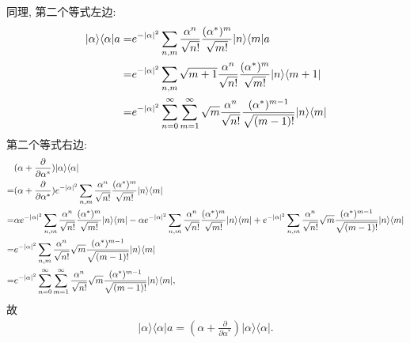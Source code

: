 \documentclass{assignment}
\begin{document}
\begin{pf}
    同理, 第二个等式左边:
    \begin{align}
        \notag\lvert\alpha\rangle\langle\alpha\rvert a=&e^{-\left\lvert\alpha\right\rvert^2}\sum_{n,m}\frac{\alpha^n}{\sqrt{n!}}\frac{(\alpha^*)^m}{\sqrt{m!}}\lvert n\rangle\langle m\rvert a\\
        \notag=&e^{-\left\lvert\alpha\right\rvert^2}\sum_{n,m}\sqrt{m+1}\frac{\alpha^n}{\sqrt{n!}}\frac{(\alpha^*)^m}{\sqrt{m!}}\lvert n\rangle\langle m+1\rvert\\
        \notag=&e^{-\left\lvert\alpha\right\rvert^2}\sum_{n=0}^{\infty}\sum_{m=1}^{\infty}\sqrt{m}\frac{\alpha^n}{\sqrt{n!}}\frac{(\alpha^*)^{m-1}}{\sqrt{(m-1)!}}\lvert n\rangle\langle m\rvert
    \end{align}
    第二个等式右边:
    \begin{align}
        \notag&(\alpha+\frac{\partial}{\partial\alpha^*})\lvert\alpha\rangle\langle\alpha\rvert\\
        \notag=&(\alpha+\frac{\partial}{\partial\alpha^*})e^{-\left\lvert\alpha\right\rvert^2}\sum_{n,m}\frac{\alpha^n}{\sqrt{n!}}\frac{(\alpha^*)^m}{\sqrt{m!}}\lvert n\rangle\langle m\rvert\\
        \notag=&\alpha e^{-\left\lvert\alpha\right\rvert^2}\sum_{n,m}\frac{\alpha^n}{\sqrt{n!}}\frac{(\alpha^*)^m}{\sqrt{m!}}\lvert n\rangle\langle m\rvert-\alpha e^{-\left\lvert\alpha\right\rvert^2}\sum_{n,m}\frac{\alpha^n}{\sqrt{n!}}\frac{(\alpha^*)^m}{\sqrt{m!}}\lvert n\rangle\langle m\rvert+e^{-\left\lvert\alpha\right\rvert^2}\sum_{n,m}\frac{\alpha^n}{\sqrt{n!}}\sqrt{m}\frac{(\alpha^*)^{m-1}}{\sqrt{(m-1)!}}\lvert n\rangle\langle m\rvert\\
        \notag=&e^{-\left\lvert\alpha\right\rvert^2}\sum_{n,m}\frac{\alpha^n}{\sqrt{n!}}\sqrt{m}\frac{(\alpha^*)^{m-1}}{\sqrt{(m-1)!}}\lvert n\rangle\langle m\rvert\\
        =&e^{-\left\lvert\alpha\right\rvert^2}\sum_{n=0}^{\infty}\sum_{m=1}^{\infty}\frac{\alpha^n}{\sqrt{n!}}\sqrt{m}\frac{(\alpha^*)^{m-1}}{\sqrt{(m-1)!}}\lvert n\rangle\langle m\rvert,
    \end{align}
    故
    \begin{align}
        \lvert\alpha\rangle\langle\alpha\rvert a=(\alpha+\frac{\partial}{\partial\alpha^*})\lvert\alpha\rangle\langle\alpha\rvert.
    \end{align}
\end{pf}
\end{document}
